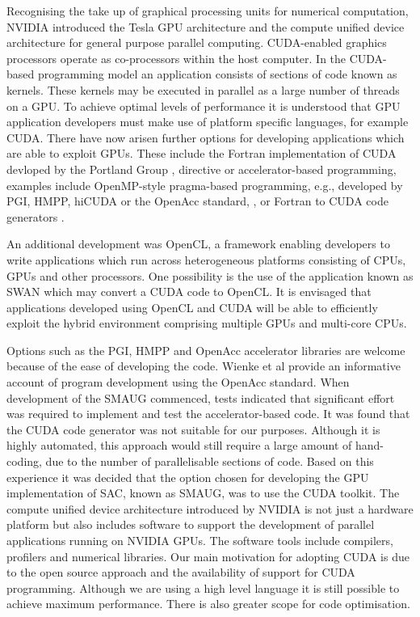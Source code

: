 \documentclass[final,1p]{elsarticle}
\begin{document}
 Recognising the take up of graphical processing units for numerical computation,  NVIDIA introduced the Tesla GPU architecture and the compute unified device architecture for general purpose parallel computing. CUDA-enabled graphics processors operate as co-processors within the  host computer. In the CUDA-based programming model an application consists of sections of code known as kernels. These kernels may be executed in parallel as a large number of threads on a GPU. To achieve optimal levels of performance it is understood that GPU application developers must make use of platform specific languages, for example CUDA.  There have now arisen further options for developing applications which are able to exploit GPUs. These include the Fortran implementation of CUDA devloped by the Portland Group \cite{Wolfe2008}, directive or accelerator-based programming, examples include OpenMP-style pragma-based programming, e.g., developed by PGI, HMPP,  hiCUDA or the OpenAcc standard\cite{Wolfe2008}, \cite{Han2011}, \cite{Wienke2012} or Fortran to CUDA code generators \cite{Govett2009}.

An additional development was OpenCL, a framework enabling developers to write applications which run across heterogeneous platforms consisting of CPUs, GPUs and other processors. One possibility is the use of the application known as SWAN  \cite{Harvey2011} which may convert a CUDA code to OpenCL. It is envisaged that  applications developed using OpenCL and CUDA will be able to efficiently  exploit the hybrid environment comprising multiple GPUs and multi-core  CPUs.

 Options such as the PGI,  HMPP and OpenAcc accelerator libraries are welcome because of the ease of developing the code. Wienke et al  \cite{Wienke2012} provide an informative account of program development using the OpenAcc standard. When development of the SMAUG commenced, tests indicated that significant effort was required to implement and test the accelerator-based code.  It was found that the CUDA code generator \cite{Govett2009} was not suitable for our purposes. Although it is highly automated, this approach would still require a large amount of hand-coding, due to the number of parallelisable sections of code. Based on this experience it was decided that the option chosen for developing the GPU implementation of SAC, known as SMAUG, was to use the CUDA toolkit. The compute unified device architecture introduced by NVIDIA is not just a hardware platform but also includes software to support the development of parallel applications running on NVIDIA GPUs. The software tools include compilers, profilers and numerical libraries. Our main motivation for adopting CUDA is due to the open source approach and the availability of support for CUDA programming. Although we are using a high level language it is still possible to achieve maximum performance. There is also greater scope for code optimisation.
\end{document}

